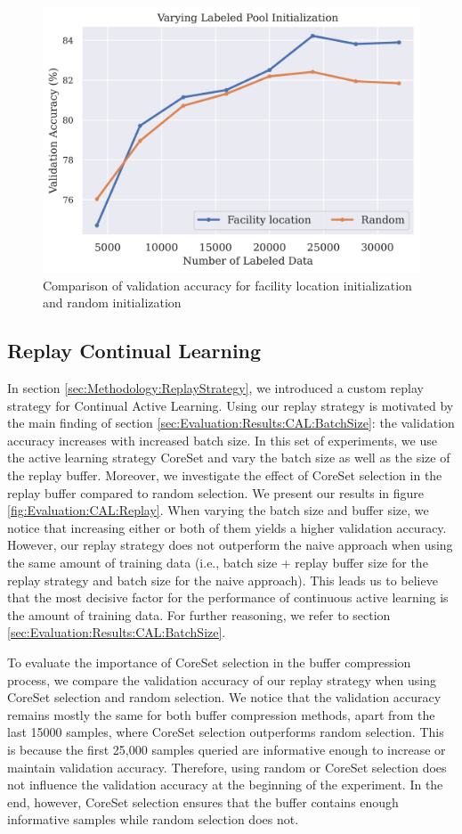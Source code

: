 \begin{figure}[h]
    \centering
    \includegraphics[width=0.6\linewidth]{images/results_CAL/Facility_location_init.png}
    \caption{Comparison of validation accuracy for facility location initialization and random initialization}
    \label{fig:Evaluation:CAL:FLinit}
\end{figure}


\subsection{Replay Continual Learning}
\label{sec:Evaluation:CAL:Replay}
In section \ref{sec:Methodology:ReplayStrategy}, we introduced a custom replay strategy for Continual Active Learning. Using our replay strategy is motivated by the main
finding of section \ref{sec:Evaluation:Results:CAL:BatchSize}: the validation accuracy increases with increased batch size. In this set of experiments, we use the active
learning strategy CoreSet and vary the batch size as well as the size of the replay buffer. Moreover, we investigate the effect of CoreSet selection in the replay buffer
compared to random selection. We present our results in figure \ref{fig:Evaluation:CAL:Replay}. When varying the batch size and buffer size, we notice that increasing either
or both of them yields a higher validation accuracy. However, our replay strategy does not outperform the naive approach when using the same amount of training data
(i.e., batch size + replay buffer size for the replay strategy and batch size for the naive approach). This leads us to believe that the most decisive factor for the performance
of continuous active learning is the amount of training data. For further reasoning, we refer to section \ref{sec:Evaluation:Results:CAL:BatchSize}. \par
To evaluate the importance of CoreSet selection in the buffer compression process, we compare the validation accuracy of our replay strategy when using CoreSet selection and
random selection. We notice that the validation accuracy remains mostly the same for both buffer compression methods, apart from the last 15000 samples, where CoreSet selection
outperforms random selection. This is because the first 25,000 samples queried are informative enough to increase or maintain validation accuracy. Therefore, using random or
CoreSet selection does not influence the validation accuracy at the beginning of the experiment. In the end, however, CoreSet selection ensures that the buffer contains
enough informative samples while random selection does not.  \par


